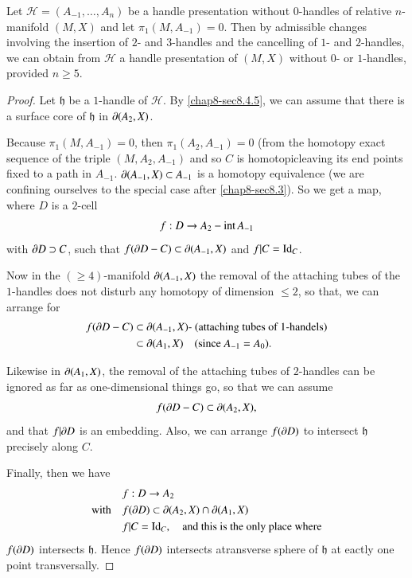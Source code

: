\begin{proposition}\label{chap8-prop8.7.3}
Let $\mathscr{H}=(A_{-1},\ldots,A_{n})$ be a handle presentation without $0$-handles of relative $n$-manifold $(M,X)$ and let $\pi_{1}(M,A_{-1})=0$. Then by admissible changes involving the insertion of $2$- and $3$-handles and the cancelling of $1$- and $2$-handles, we can obtain from $\mathscr{H}$ a handle presentation of $(M,X)$ without $0$- or $1$-handles, provided $n\geq 5$.
\end{proposition}

\begin{proof}
Let $\mathfrak{h}$ be a $1$-handle of $\mathscr{H}$. By \ref{chap8-sec8.4.5}, we can assume that there is a surface core of $\mathfrak{h}$ in $\partial (A_{2},X)$.

Because $\pi_{1}(M,A_{-1})=0$, then $\pi_{1}(A_{2},A_{-1})=0$ (from the homotopy exact sequence of the triple $(M,A_{2},A_{-1})$ and so $C$ is homotopic\pageoriginale leaving its end points fixed to a path in $A_{-1}$. $\partial(A_{-1},X)\subset A_{-1}$ is a homotopy equivalence (we are confining ourselves to the special case after \ref{chap8-sec8.3}). So we get a map, where $D$ is a $2$-cell
$$
f:D\to A_{2}-\text{int\,}A_{-1}
$$
with $\partial D\supset C$, such that $f(\partial D-C)\subset \partial(A_{-1},X)$ and $f|C=\operatorname{Id}_{C}$. 

Now in the $(\geq 4)$-manifold $\partial(A_{-1},X)$ the removal of the attaching tubes of the $1$-handles does not disturb any homotopy of dimension $\leq 2$, so that, we can arrange for 
\begin{align*}
f(\partial D-C) &\subset \partial (A_{-1},X)\text{- (attaching tubes of 1-handels)}\\
&\subset \partial (A_{1},X)\quad(\text{since~ } A_{-1}=A_{0}).
\end{align*}

Likewise in $\partial (A_{1},X)$, the removal of the attaching tubes of $2$-handles can be ignored as far as one-dimensional things go, so that we can assume
$$
f(\partial D-C)\subset \partial (A_{2},X),
$$
and that $f|\partial D$ is an embedding. Also, we can arrange $f(\partial D)$ to intersect $\mathfrak{h}$ precisely along $C$.

Finally, then we have 
\begin{align*}
& f:D\to A_{2}\\
\text{with}\quad & f(\partial D)\subset \partial (A_{2},X)\cap \partial (A_{1},X)\\
& f|C=\operatorname{Id}_{C},\quad\text{and this is the only place where}
\end{align*}
$f(\partial D)$ intersects $\mathfrak{h}$. Hence $f(\partial D)$ intersects  atransverse sphere of $\mathfrak{h}$ at eactly one point transversally.


\end{proof}
